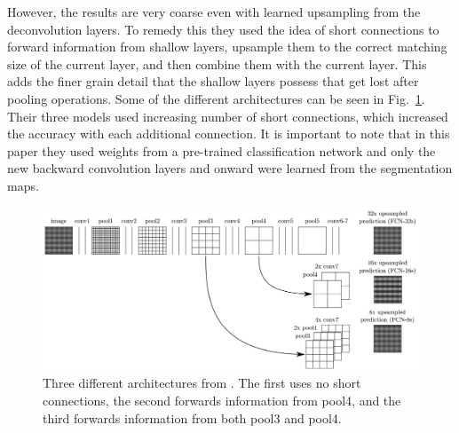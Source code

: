 However, the results are very coarse even with learned upsampling from the deconvolution layers. To remedy this they used the idea of short connections to forward information from shallow layers, upsample them to the correct matching size of the current layer, and then combine them with the current layer. This adds the finer grain detail that the shallow layers possess that get lost after pooling operations. Some of the different architectures can be seen in Fig.~\ref{f:fcn2}. Their three models used increasing number of short connections, which increased the accuracy with each additional connection. It is important to note that in this paper they used weights from a pre-trained classification network and only the new backward convolution layers and onward were learned from the segmentation maps. 
\begin{figure}[h!]
	\centering
		\includegraphics[width=1.0\textwidth]{figures/fcn2.png}
	\caption{Three different architectures from \cite{long2015fully}. The first uses no short connections, the second forwards information from pool4, and the third forwards information from both pool3 and pool4.}
	\label{f:fcn2}
\end{figure}

